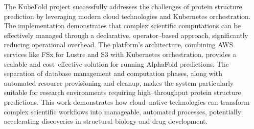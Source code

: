 The KubeFold project successfully addresses the challenges of protein structure prediction by leveraging modern cloud technologies and Kubernetes orchestration.
The implementation demonstrates that complex scientific computations can be effectively managed through a declarative, operator--based approach, significantly reducing operational overhead.
The platform's architecture, combining AWS services like FSx for Lustre and S3 with Kubernetes orchestration, provides a scalable and cost--effective solution for running AlphaFold predictions.
The separation of database management and computation phases, along with automated resource provisioning and cleanup, makes the system particularly suitable for research environments requiring high--throughput protein structure predictions.
This work demonstrates how cloud--native technologies can transform complex scientific workflows into manageable, automated processes, potentially accelerating discoveries in structural biology and drug development.